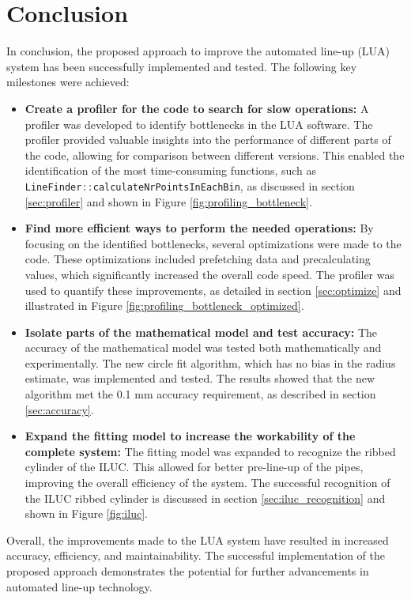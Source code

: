 \section{Conclusion}
\label{sec:conclusion}

In conclusion, the proposed approach to improve the automated line-up (LUA) system has been successfully implemented and tested. The following key milestones were achieved:

\begin{itemize}
    \item \textbf{Create a profiler for the code to search for slow operations:} A profiler was developed to identify bottlenecks in the LUA software. The profiler provided valuable insights into the performance of different parts of the code, allowing for comparison between different versions. This enabled the identification of the most time-consuming functions, such as \lstinline[language=c]|LineFinder::calculateNrPointsInEachBin|, as discussed in section \ref{sec:profiler} and shown in Figure \ref{fig:profiling_bottleneck}.
    
    \item \textbf{Find more efficient ways to perform the needed operations:} By focusing on the identified bottlenecks, several optimizations were made to the code. These optimizations included prefetching data and precalculating values, which significantly increased the overall code speed. The profiler was used to quantify these improvements, as detailed in section \ref{sec:optimize} and illustrated in Figure \ref{fig:profiling_bottleneck_optimized}.
    
    \item \textbf{Isolate parts of the mathematical model and test accuracy:} The accuracy of the mathematical model was tested both mathematically and experimentally. The new circle fit algorithm, which has no bias in the radius estimate, was implemented and tested. The results showed that the new algorithm met the 0.1 mm accuracy requirement, as described in section \ref{sec:accuracy}.
    
    \item \textbf{Expand the fitting model to increase the workability of the complete system:} The fitting model was expanded to recognize the ribbed cylinder of the ILUC. This allowed for better pre-line-up of the pipes, improving the overall efficiency of the system. The successful recognition of the ILUC ribbed cylinder is discussed in section \ref{sec:iluc_recognition} and shown in Figure \ref{fig:iluc}.
    
\end{itemize}

Overall, the improvements made to the LUA system have resulted in increased accuracy, efficiency, and maintainability. The successful implementation of the proposed approach demonstrates the potential for further advancements in automated line-up technology.